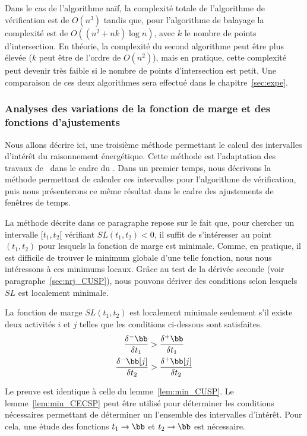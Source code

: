 Dans le cas de l'algorithme naïf, la complexité totale de l'algorithme
de vérification est de $O(n^3)$ tandis que, pour l'algorithme de
balayage la complexité est de $O((n^2+nk) \log n)$, avec $k$ le nombre
de points d'intersection. En théorie, la complexité du second
algorithme peut être plus élevée ($k$ peut être de l'ordre de
$O(n^2)$), mais en pratique, cette complexité peut devenir très faible
si le nombre de points d'intersection est petit. Une comparaison de
ces deux algorithmes sera effectué dans le chapitre~\ref{sec:expe}.

\subsubsection{Analyses des variations de la fonction de marge et des
  fonctions d'ajustements}

Nous allons décrire ici, une troisième méthode permettant le calcul des
intervalles d'intérêt du raisonnement énergétique. Cette méthode est
l'adaptation des travaux de~\cite{DP} dans le cadre du \CUSP. Dans un
premier temps, nous décrivons la méthode permettant de calculer ces
intervalles pour l'algorithme de vérification, puis nous présenterons
ce même résultat dans le cadre des ajustements de fenêtres de temps. 

 La méthode décrite dans ce paragraphe repose sur le fait que, pour
 chercher un intervalle $[t_1,t_2[$ vérifiant $SL(t_1,t_2) < 0$, il
 suffit de s'intéresser au point $(t_1,t_2)$ pour lesquels la
 fonction de marge est minimale. Comme, en pratique, il est difficile
 de trouver le minimum globale d'une telle fonction, nous nous
 intéressons à ces minimums locaux. Grâce au test de la dérivée
 seconde (voir paragraphe~\ref{sec:nrj_CUSP}), nous pouvons dériver
 des conditions selon lesquels $SL$ est localement minimale.

\begin{lemma}[\cite{DP}]
\label{lem:min_CECSP}
La fonction de marge $SL(t_1,t_2)$ est localement minimale seulement
s'il existe deux activités $i$ et $j$ telles que les conditions
ci-dessous sont satisfaites. 
\begin{align} \frac{\delta^{-}\bb}{\delta t_1} &>
\frac{\delta^{+}\bb}{\delta t_1} \label{eq:deriv1_CECSP}\\ 
\frac{\delta^{-}\bb[j]}{\delta t_2}
& > \frac{\delta^{+}\bb[j]}{\delta t_2} \label{eq:deriv2_CECSP}
\end{align}
\end{lemma}

Le preuve est identique à celle du lemme~\ref{lem:min_CUSP}. Le
lemme~\ref{lem:min_CECSP} peut être utilisé pour déterminer les
conditions nécessaires permettant de déterminer un l'ensemble des
intervalles d'intérêt. Pour cela, une étude des fonctions $t_1
\rightarrow \bb$ et $t_2 \rightarrow \bb$ est nécessaire. 

